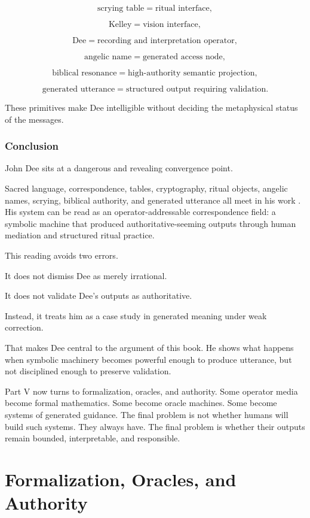 \documentclass[11pt]{book}
\begin{document}
\[
\text{scrying table} = \text{ritual interface},
\]

\[
\text{Kelley} = \text{vision interface},
\]

\[
\text{Dee} = \text{recording and interpretation operator},
\]

\[
\text{angelic name} = \text{generated access node},
\]

\[
\text{biblical resonance} = \text{high-authority semantic projection},
\]

\[
\text{generated utterance} = \text{structured output requiring validation}.
\]

These primitives make Dee intelligible without deciding the metaphysical status of the messages.

\section{Conclusion}

John Dee sits at a dangerous and revealing convergence point.

Sacred language, correspondence, tables, cryptography, ritual objects, angelic names, scrying, biblical authority, and generated utterance all meet in his work \cite{DeeCasaubon1659TrueFaithfulRelation,Yates1964GiordanoBruno}. His system can be read as an operator-addressable correspondence field: a symbolic machine that produced authoritative-seeming outputs through human mediation and structured ritual practice.

This reading avoids two errors.

It does not dismiss Dee as merely irrational.

It does not validate Dee's outputs as authoritative.

Instead, it treats him as a case study in generated meaning under weak correction.

That makes Dee central to the argument of this book. He shows what happens when symbolic machinery becomes powerful enough to produce utterance, but not disciplined enough to preserve validation.

Part V now turns to formalization, oracles, and authority. Some operator media become formal mathematics. Some become oracle machines. Some become systems of generated guidance. The final problem is not whether humans will build such systems. They always have. The final problem is whether their outputs remain bounded, interpretable, and responsible.

\part{Formalization, Oracles, and Authority}
\end{document}
